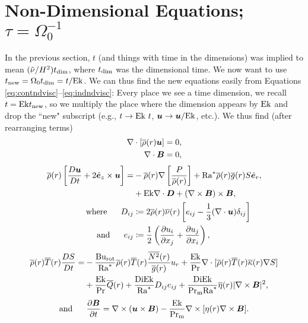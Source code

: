 \documentclass[12pt]{article}
\numberwithin{equation}{section}
\begin{document}
\section{Non-Dimensional Equations; $\tau=\Omega_0^{-1}$}
In the previous section, $t$ (and things with time in the dimensions) was implied to mean $(\tilde{\nu}/H^2) t_{\rm{dim}}$, where $t_{\rm{dim}}$ was the dimensional time. We now want to use $t_{\rm{new}}= \Omega_0t_{\rm{dim}} = t/{\rm{Ek}}$. We can thus find the new equations easily from Equations \eqref{eq:contndvisc}--\eqref{eq:indndvisc}: Every place we see a time dimension, we recall $t={\rm{Ek}} t_{\rm{new}}$, so we multiply the place where the dimension appears by ${\rm{Ek}}$ and drop the ``new" subscript (e.g., $t\rightarrow {\rm{Ek}}\ t$, $\bm{u}\rightarrow\bm{u}/{\rm{Ek}}$, etc.).  We thus find (after rearranging terms)
\begin{align}
	\nabla\cdot[\overline{\rho}(r)\bm{u}] &= 0\label{eq:contndrot},\\
	\nabla\cdot \bm{B} &= 0,
\end{align}
\begin{subequations}\label{eq:momndrot}
	\begin{align}
		\overline{\rho}(r)\left[\frac{D\bm{u}}{Dt} + 2\hat{\bm{e}}_z\times\bm{u}\right] = &-\overline{\rho}(r)\nabla\left[ \frac{P}{\overline{\rho}(r)} \right] + {\rm{Ra}}^* \overline{\rho}(r)\overline{g}(r) S\hat{\bm{e}}_r, \nonumber\\
		&+ {\rm{Ek}} \nabla\cdot\bm{D} +(\nabla\times\bm{B})\times\bm{B},\\
		\text{where}\ \ \ \ \  D_{ij} &\coloneqq 2\overline{\rho}(r)\overline{\nu}(r) \left[e_{ij} - \frac{1}{3}(\nabla\cdot\bm{u}) \delta_{ij} \right]\\
		\text{and}\ \ \ \ \  e_{ij} &\coloneqq \frac{1}{2}\left(\frac{\partial u_i}{\partial x_j} + \frac{\partial u_j}{\partial x_i} \right),
	\end{align}
\end{subequations}
\begin{align}\label{eq:enndrot}
	\overline{\rho}(r)\overline{T}(r) \frac{DS}{Dt} = &- \frac{{\rm{Bu_{rot}}}}{{\rm{Ra}}^*} \overline{\rho}(r)\overline{T}(r) \frac{\overline{N^2}(r)}{\overline{g}(r)} u_r + \frac{{\rm{Ek}}}{{\rm{Pr}}} \nabla\cdot[\overline{\rho}(r) \overline{T}(r) \overline{\kappa}(r) \nabla S] \nonumber \\
	&+ \frac{{\rm{Ek}}}{{\rm{Pr}}} \overline{Q}(r) + \frac{{\rm{Di}}{\rm{Ek}}}{{\rm{Ra}}^*} D_{ij}e_{ij} + \frac{{\rm{Di}}{\rm{Ek}}}{{\rm{Pr_m}}{\rm{Ra}}^*} \overline{\eta}(r)|\nabla\times\bm{B}|^2,
\end{align}
\begin{align}\label{eq:indndrot}
	\text{and}\ \ \ \ \  \frac{\partial\bm{B}}{\partial t} = \nabla\times(\bm{u}\times\bm{B}) - \frac{{\rm{Ek}}}{{\rm{Pr_m}}} \nabla\times[\eta(r)\nabla\times\bm{B}].
\end{align}	
\end{document}
